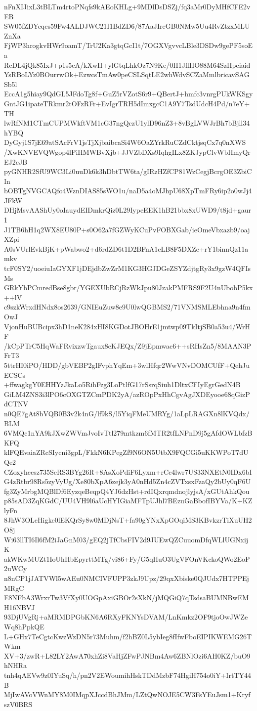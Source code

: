 nFnXIJixL3tBLTm4rtoPNqfs9kAEoKHLg+9MDlDsDSZj/fq3aMr0DyMHfCFE2vEB
SW05fZDYcqcs59Fw4ALDJWC21I1BdZD6/87AaJIreGB0NMw5Uu4RvZtzxMLUZnXa
FjWP3hrogkvHWr9oamT/TrU2Ka3gtqGcI1t/7OGXVgvvcLBle3DSDw9gePF5soEa
RcDL4jQk85IxJ+p1s5eA/kXwH+ylGtqLhkOz7N9Ke/0H1JflHO88M64SzHpeiaid
YsRBoLYz0BOurrwOk+EzwcsTmAw0peCSLSqtLE2whWdvSCZaMmlbricavSAGSb5l
EccA1g5hiay9QdGL5JFdoTg8f+GuZ5rVZotS6r9+QBertJ+hmfc3vnrgPUkWKSgy
GntJG1ipateTRkmr2tOFzRFr+EvIgrTRH5dImxgcC1A9Y7TsdUdcH4Pd/n7eY+TH
lwRfNM1CTmCUPMWkftVM1cG37ngQczU1ylD96nZ3+8vBgLVWJrBh7bBjll34hYBQ
DyGyj1S7jE69atSAcFrV1jsTjXjbaibcaSi4W6OaZYrkRuCZdCktjsqCx7q0nXWS
/XwKNVEVQWgop4lPiHMWBvXjb+JJVZbDXs9IqhgILx8ZKJypClvWbHmyQrEJ2cJB
pyGNHR2SfU9WC3Li0uuDk6k3hDbtTW6ta/gIRzHZfCP81WzCegjBcrgOE3ZbiCIn
bOBTgNVGCAQfo4WznDIAS85sWO1u/naD5a4oMJhpU68XpTmFRy6ip2o0wJj4JFkW
DHjMsvAAShUy0oIauydEIDmkrQiz0L29IypeEEK1hB21bbx8xUWD9/t8jd+gaur1
J1TB6hH1q2WX8EU80P+s0O62a7fGZWyKCuPvFOBXGab/ieOmeVbxazb9/oajXZpi
A0sVUrlEvkBjK+pWabwo2+d6rdZD6t1D2BFnA1cLB8F5DXZe+rY1binnQz11amkv
tcF0SY2/uoeiuIaGYXF1jDEjdbZwZrM1KG3HGJDGeZSYZdjtgRy3x9gzW4QFIsMs
GRkYbPCmredBse8gbr/YGEXUbRCjRzWkJpu80JzakPMFRS9F2U4nUbobP5kx++lV
c9szkWrxdHNdx8os2639/GNIEuZuw8e9U0lwQGBMS2/71VNMSMLEbhna9n4fmOwJ
VjonHuBUBcipx3hD1neK284xHI8KGDotJBOHrE1jmtwp09TkItjSB0a53u4/WrHF
/kCpPTrC5HqWaFRvixzwTgaux8eKJEQx/Z9jEpmwac6++sRHsZn5/8MAAN3PFrT3
5ttrHI0iPO/HDD/gbVEBP2gIFvphYqEm+3wlHfqr2WwVNvDOMCUfF+QehJuECSCs
+ffwagkgY0EHHYzJkaLo5RihFzg3LoPtlfG17rSsrqSiuh1DltxCFIyEgrGedN4B
GiLM4ZNS3i3lPO6cOXGTZCmPDK2yA/azROpPxHhCgvAgJXDEyooe68qGizPdCTNV
n0QE7gAt8bVQB0B3v2k4nG/lf9kS/l5YiqFMeUMRYg/1aLpLRAGXn8lKVQdx/BLM
6VMQc1nYA9kJXwZWVmJvoIvTtl279mtkzm6fMTR2tfLNPnD9j5gAfdOWLbfzBKFQ
klFQEvaiaZRcSIycni3gpL/FkkN6KPegZf9N6ON5UtbX9FQCGi5uKKWPoT7dUQe2
CZoxyhccsz735SeRS3BYg26R+8AsXoPdiF6Lyxm+rCc4lwr7US33NXEtN0IDx6bI
G4zRtbr98Rs5zyVyUg/Xe80bXpA6zejk3yA0nHd5Zn4cZVTxsxFzaQy2bUy0qF6U
fg3ZyMrbgMQBlDf6EyzqeBeqpQ4YJ6dzHst+rdIQxrqmdnojlyjsA/xGUtAhkQou
p85sAD3ZqKGdC/UU4VH9l6aUcHYIGiaMFTpUJhl7BEzuGaBbofIBYVa/K+KZlyFn
8JhW3OLcHigke0lEKQrSy8w0MDjNsT+fa90gYNxXpGOqiMS3KBvkzrTiXuUH2O8j
Wi63llTI6Il6fM2iJaGnM03/gEQ2jTfCbsFIV2d9JUEwQZCuuomDfqWLlUGNxijK
akWKwMUZt1IoUhHbEpyrttMTg/vi86+Fy/G5qHuO3UgVFOnVKckoQWo2EoP2uWCy
n8nCP1jJATVWl5wAEu0NMCIVFUPP3zkJ9Upz/29qxXbiske0QJUdx7HTPPEjMRgC
E8NFbA3WrxrTw3VfXy0UOGpAxiGBOr2sXkN/jMQGiQ7qTsdsaBUMNBwEMH16NBVJ
93DjUVgRj+aMRMDPGbKN6A6RXyFKNYsDVAM/LnKmkz2OF9tjoOwJWZeWq8hPpkQE
L+GHx7TeCgtcKwzWzDN5r73Muhm/f2hBZ0L5ybIeg8fIfwFboEIPIKWEMG26TWkm
XV+3/zwR+L82LY2AwA70xhZi8VaHjZFwPJNBm4Aw6ZBNlOzi6AH0KZ/buO9hNHRa
tnh4qAEVw9z0IYuSq/h/pn2V2EWoumihHskTDdMzbF74HgiH754o0iY+IrtTY44B
MjIwAVoVWnMY8M0IMqpXJccdBhJMm/LZtQwNOJE5CW3FsYEuJsm1+KryfszV0BRS
